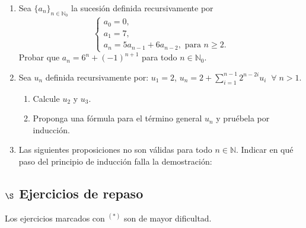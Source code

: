 \documentclass[a4paper,12pt,twoside,spanish,reqno]{amsbook}
\numberwithin{equation}{section}
\begin{document}
\begin{enumerate}
\item Sea $\{a_n\}_{n\in\mathbb N_0}$ la sucesión definida recursivamente por
    \begin{equation*}
        \begin{cases}
            a_0=0, \\a_1=7, \\a_{n} = 5a_{n-1}+6a_{n-2}, \text{ para $n\geq 2$}.
        \end{cases}
    \end{equation*}
    Probar que $a_n=6^n + (-1)^{n+1}$ para todo $n\in \mathbb N_0$.


\item Sea $u_n$ definida recursivamente por: $u_1=2$, $u_n=2+\sum_{i=1}^{n-1}2^{n-2i}u_i \;\;\forall\; n >1$.
    \begin{enumerate}
        \item Calcule $u_2$ y $u_3$.
        \item Proponga una fórmula para el término general $u_n$ y pruébela por inducción.
    \end{enumerate}


\item Las siguientes proposiciones no son válidas para todo $n \in {\mathbb N}$. Indicar en qué paso del principio de inducción falla la demostración:

\end{enumerate}

\subsection*{$\S$ Ejercicios de repaso} Los ejercicios marcados con ${}^{(*)}$ son de mayor dificultad.
\end{document}
